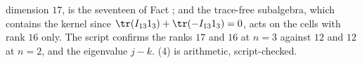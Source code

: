 dimension $17$, is the seventeen of Fact ; and the trace-free subalgebra, which contains the kernel since $\tr(I_{13}1_{3}) + \tr(-I_{13}1_{3}) = 0$, acts on the cells with rank $16$ only. The script confirms the ranks $17$ and $16$ at $n = 3$ against $12$ and $12$ at $n = 2$, and the eigenvalue $j - k$. (4) is arithmetic, script-checked.
